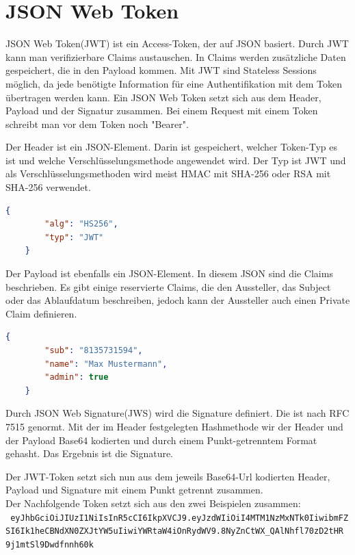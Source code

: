 \section{JSON Web Token}
JSON Web Token(JWT) ist ein Access-Token, der auf JSON basiert. Durch JWT kann man verifizierbare Claims austauschen. In Claims werden zusätzliche Daten gespeichert, die in den Payload kommen. Mit JWT sind Stateless Sessions möglich, da jede benötigte Information für eine Authentifikation mit dem Token übertragen werden kann. Ein JSON Web Token setzt sich aus dem Header, Payload und der Signatur zusammen. Bei einem Request mit einem Token schreibt man vor dem Token noch "Bearer". \autocite{wikiJWT}

Der Header ist ein JSON-Element. Darin ist gespeichert, welcher Token-Typ es ist und welche Verschlüsselungsmethode angewendet wird. Der Typ ist JWT und als Verschlüsselungsmethoden wird meist HMAC mit SHA-256 oder RSA mit SHA-256 verwendet. \autocite{wikiJWT} \\
\begin{lstlisting}[caption={JWT-Header Beispiel}, language=json]
	{
		"alg": "HS256",
		"typ": "JWT"
	}
\end{lstlisting}

Der Payload ist ebenfalls ein JSON-Element. In diesem JSON sind die Claims beschrieben. Es gibt einige reservierte Claims, die den Aussteller, das Subject oder das Ablaufdatum beschreiben, jedoch kann der Aussteller auch einen Private Claim definieren. \autocite{wikiJWT} \\
\begin{lstlisting}[caption={JWT-Payload Beispiel}, language=json]
	{
		"sub": "8135731594",
		"name": "Max Mustermann",
		"admin": true
	}
\end{lstlisting}

Durch JSON Web Signature(JWS) wird die Signature definiert. Die ist nach RFC 7515 genormt. Mit der im Header festgelegten Hashmethode wir der Header und der Payload Base64 kodierten und durch einem Punkt-getrenntem Format gehasht. Das Ergebnis ist die Signature. \autocite{wikiJWT}

Der JWT-Token setzt sich nun aus dem jeweils Base64-Url kodierten Header, Payload und Signature mit einem Punkt getrennt zusammen. \autocite{wikiJWT} \\
Der Nachfolgende Token setzt sich aus den zwei Beispielen zusammen:\\
\texttt{
	eyJhbGciOiJIUzI1NiIsInR5cCI6IkpXVCJ9.eyJzdWIiOiI4MTM1NzMxNTk0IiwibmFZ\\SI6Ik1heCBNdXN0ZXJtYW5uIiwiYWRtaW4iOnRydWV9.8NyZnCtWX\_QAlNhfl70zD2tHR\\9j1mtSl9Dwdfnnh60k
}

